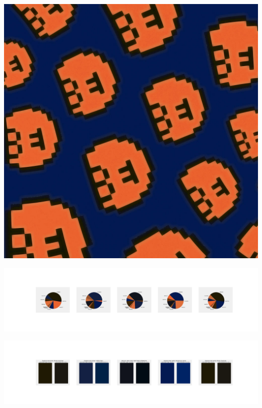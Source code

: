 \documentclass[11pt]{article}
\begin{document}
\begin{landscape}
    \begin{center}
    \includegraphics[width=\textwidth]{./nbimg/file (386).jpg}
    \end{center}

    \begin{center}
    \includegraphics[width=250mm]{./nbimg/pie-318.jpg}
    \end{center}

    \begin{center}
    \includegraphics[width=250mm]{./nbimg/peak-318.jpg}
    \end{center}
    


\end{landscape}
\end{document}
